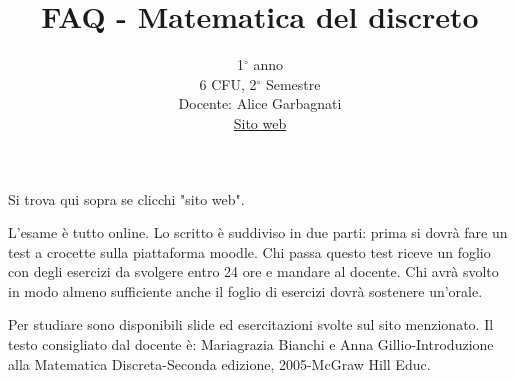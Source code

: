 \documentclass{article}
\title{FAQ - \textbf{Matematica del discreto}}
\author{
	1$^{\circ}$ anno \\6 CFU, 2$^{\circ}$ Semestre\\
	Docente: Alice Garbagnati \\ 
	\href{https://agarbagnatimd.ariel.ctu.unimi.it/v5/home/Default.aspx}{Sito web}
	\date{}
}
\begin{document}
 
\maketitle

\begin{QuestionList}

 {
	Si trova qui sopra se clicchi "sito web".
}
	
 {
	L'esame è tutto online. Lo scritto è suddiviso in due parti: prima si dovrà fare un test a crocette sulla piattaforma moodle. Chi passa questo test riceve un foglio con degli esercizi da svolgere entro 24 ore e mandare al docente. Chi avrà svolto in modo almeno sufficiente anche il foglio di esercizi dovrà sostenere un'orale.
}

 {
	Per studiare sono disponibili slide ed esercitazioni svolte sul sito menzionato. Il testo consigliato dal docente è: Mariagrazia Bianchi e Anna Gillio-Introduzione alla Matematica Discreta-Seconda edizione, 2005-McGraw Hill Educ.
}

\end{QuestionList}
\end{document}
